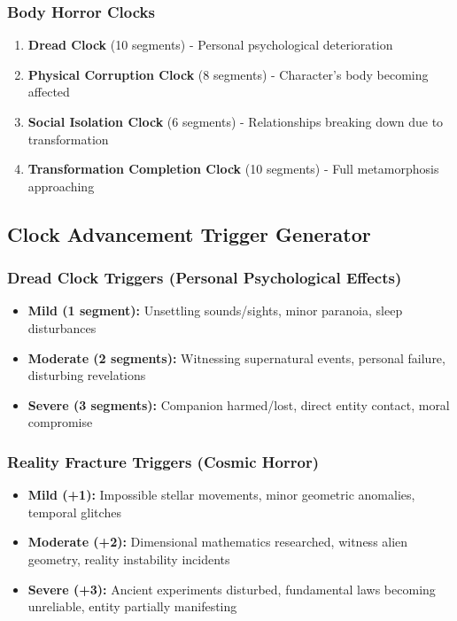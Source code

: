 \documentclass[11pt]{article}
\begin{document}
\subsubsection{Body Horror Clocks}
\begin{enumerate}
\item \textbf{Dread Clock} (10 segments) - Personal psychological deterioration
\item \textbf{Physical Corruption Clock} (8 segments) - Character's body becoming affected
\item \textbf{Social Isolation Clock} (6 segments) - Relationships breaking down due to transformation
\item \textbf{Transformation Completion Clock} (10 segments) - Full metamorphosis approaching
\end{enumerate}

\subsection{Clock Advancement Trigger Generator}

\subsubsection{Dread Clock Triggers (Personal Psychological Effects)}
\begin{itemize}
\item \textbf{Mild (1 segment):} Unsettling sounds/sights, minor paranoia, sleep disturbances
\item \textbf{Moderate (2 segments):} Witnessing supernatural events, personal failure, disturbing revelations
\item \textbf{Severe (3 segments):} Companion harmed/lost, direct entity contact, moral compromise
\end{itemize}

\subsubsection{Reality Fracture Triggers (Cosmic Horror)}
\begin{itemize}
\item \textbf{Mild (+1):} Impossible stellar movements, minor geometric anomalies, temporal glitches
\item \textbf{Moderate (+2):} Dimensional mathematics researched, witness alien geometry, reality instability incidents
\item \textbf{Severe (+3):} Ancient experiments disturbed, fundamental laws becoming unreliable, entity partially manifesting
\end{itemize}
\end{document}
